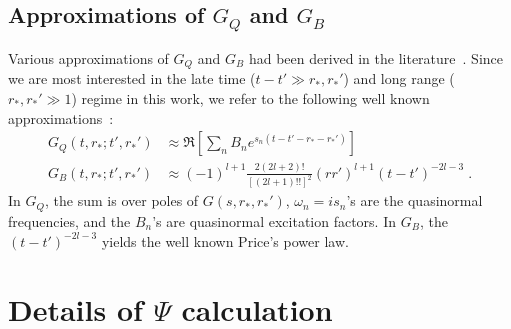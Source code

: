 \documentclass[reprint,aps,physrev,superscriptaddress,10pt,notitlepage,prd,nofootinbib,onecolumn]{revtex4-2}
\begin{document}
\subsection{Approximations of $G_Q$ and $G_B$}
\label{sec:GQ_and_GB}
Various approximations of $G_Q$ and $G_B$ had been derived in the literature~\cite{Leaver:1986gd,Andersson:1996cm}.
Since we are most interested in the late time ($t-t' \gg r_*,r_*'$) and long range ($r_*, r_*' \gg 1$) regime in this work, we refer to the following well known approximations~\cite{Leaver:1986gd,Berti:2006wq}:
\begin{align}
  \label{eq:GQ_GB_expressions}
  G_Q(t,r_*;t',r_*') &\approx %
                       \Re \left[ \sum_n B_n e^{s_n (t-t'-r_*-r_*')} \right]
    \nonumber \\
  G_B(t,r_*;t',r_*') &\approx %
                       (-1)^{l+1} \frac{2(2l+2)!}{[(2l+1)!!]^2} (rr')^{l+1} (t-t')^{-2l-3} \;.
\end{align}
In $G_Q$, the sum is over poles of $G(s,r_*,r_*')$, $\omega_n = i s_n$'s are the quasinormal frequencies, and the $B_n$'s are quasinormal excitation factors. %
In $G_B$, the $(t-t')^{-2l-3}$ yields the well known Price's power law.



\section{Details of $\Psi$ calculation}
\label{sec:Psi_details}
\end{document}
